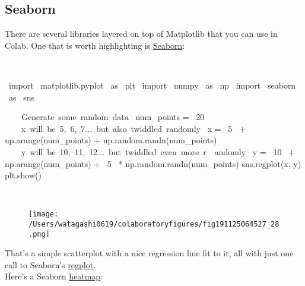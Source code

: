 \subsection{Seaborn}
There are several libraries layered on top of Matplotlib that you can use in Colab. One that is worth highlighting is \href{http://seaborn.pydata.org}{Seaborn}:\\

\begin{paracol}{2}
\smallskip
\begin{cellExecute}[escapechar=~]
~~
\end{cellExecute}
\switchcolumn
\begin{codeCell}[escapechar=~]
~\textcolor{mtk17}{import}~ matplotlib.pyplot ~\textcolor{mtk17}{as}~ plt
~\textcolor{mtk17}{import}~ numpy ~\textcolor{mtk17}{as}~ np
~\textcolor{mtk17}{import}~ seaborn ~\textcolor{mtk17}{as}~ sns

~~~\textcolor{mtk8}{ Generate some random data}~
num_points = ~\textcolor{mtk7}{20}~
~~~\textcolor{mtk8}{ x will be 5, 6, 7... but also twiddled randomly}~
x = ~\textcolor{mtk7}{5}~ + np.arange(num_points) + np.random.randn(num_points)
~~~\textcolor{mtk8}{ y will be 10, 11, 12... but twiddled even more r}~~\textcolor{mtk8}{andomly}~
y = ~\textcolor{mtk7}{10}~ + np.arange(num_points) + ~\textcolor{mtk7}{5}~ * np.random.randn(num_points)
sns.regplot(x, y)
plt.show()
\end{codeCell}
\end{paracol}

\begin{paracol}{2}
\begin{cellExecute}[escapechar=~]
~~
\end{cellExecute}
\switchcolumn
\begin{resultCell}[escapechar=~]
\end{resultCell}
\end{paracol}

\begin{figure}[H]
\centering
\texttt{[image: /Users/watagashi0619/colaboratoryfigures/fig191125064527\_28.png]}
\end{figure}
That's a simple scatterplot with a nice regression line fit to it, all with just one call to Seaborn's \href{http://seaborn.pydata.org/generated/seaborn.regplot.html#seaborn.regplot}{regplot}.\\
Here's a Seaborn \href{https://seaborn.pydata.org/generated/seaborn.heatmap.html}{heatmap}:\\

